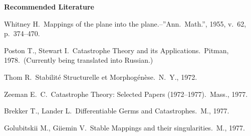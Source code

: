 \documentclass[12pt]{amsart}
\begin{document}
\noindent\textbf{Recommended Literature}

\noindent Whitney H.\ Mappings of the plane into the plane.--''Ann.\ Math.'',
1955, v.\ 62, p.\ 374--470.

\noindent Poston T., Stewart I.\ Catastrophe Theory and its
Applications.\ Pitman, 1978.\ (Currently being translated into Russian.)

\noindent Thom R.\ Stabilit\'e Structurelle et Morphog\'en\`ese.\ N.\ Y., 1972.

\noindent Zeeman E.\ C.\ Catastrophe Theory: Selected Papers
(1972--1977).\ Mass., 1977.

\noindent Brekker T., Lander L.\ Differentiable Germs and Catastrophes.\ M.,
1977.

\noindent Golubitskii M., Giiemin V.\ Stable Mappings and their
singularities.\ M., 1977.
\end{document}
